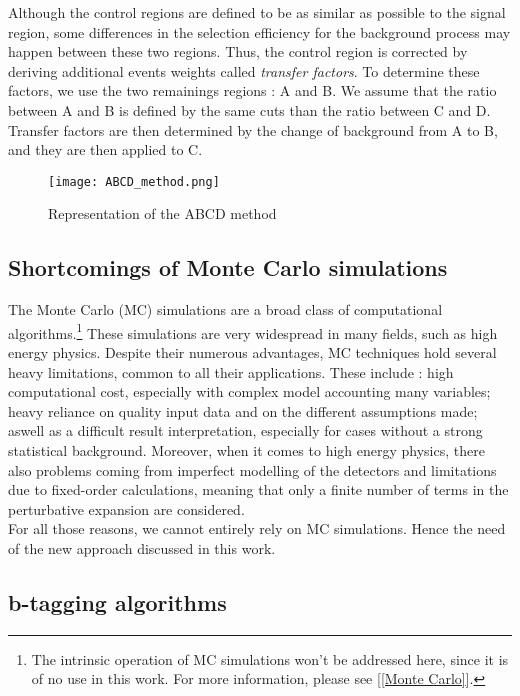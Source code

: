 Although the control regions are defined to be as similar as possible to the signal region, some differences in the selection efficiency for the background process may happen between these two regions. Thus, the control region is corrected by deriving additional events weights called \textit{transfer factors}. To determine these factors, we use the two remainings regions : A and B. We assume that the ratio between A and B is defined by the same cuts than the ratio between C and D. Transfer factors are then determined by the change of background from A to B, and they are then applied to C.

\begin{figure}[h]
    \centering
    \texttt{[image: ABCD\_method.png]}
    \caption{Representation of the ABCD method}
    \label{fig:abcd}
\end{figure}

\subsection{Shortcomings of Monte Carlo simulations}

The Monte Carlo (MC) simulations are a broad class of computational algorithms.\footnote{The intrinsic operation of MC simulations won't be addressed here, since it is of no use in this work. For more information, please see [\ref{Monte Carlo}].} These simulations are very widespread in many fields, such as high energy physics.
Despite their numerous advantages, MC techniques hold several heavy limitations, common to all their applications. These include : high computational cost, especially with complex model accounting many variables; heavy reliance on quality input data and on the different assumptions made; aswell as a difficult result interpretation, especially for cases without a strong statistical background. Moreover, when it comes to high energy physics, there also problems coming from imperfect modelling of the detectors and limitations due to fixed-order calculations, meaning that only a finite number of terms in the perturbative expansion are considered.\\
For all those reasons, we cannot entirely rely on MC simulations. Hence the need of the new approach discussed in this work.

\subsection{b-tagging algorithms}


